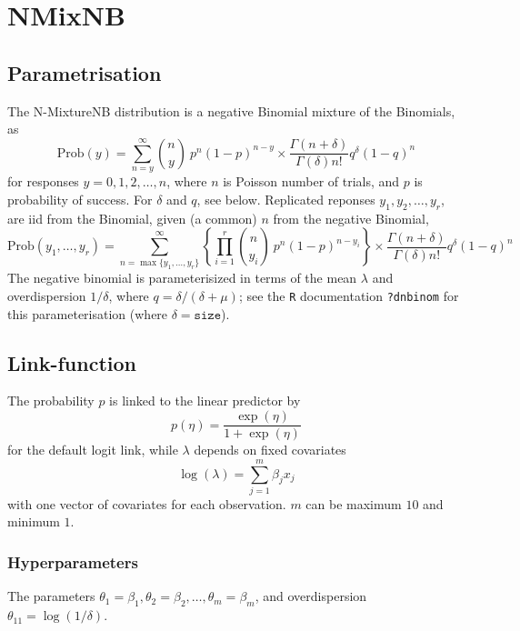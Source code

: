 \documentclass[a4paper,11pt]{article}
\def\mmax{10}
\def\mmaxp1{11}
\begin{document}
\section*{NMixNB}

\subsection*{Parametrisation}

The N-MixtureNB distribution is a negative Binomial mixture of the Binomials, as
\begin{displaymath}
    \text{Prob}(y) = \sum_{n=y}^{\infty} {n \choose y} \ p^n
    (1-p)^{n-y} \times \frac{\Gamma(n + \delta)}{\Gamma(\delta) n!}
    q^{\delta}(1-q)^{n}
\end{displaymath}
for responses $y=0, 1, 2, \ldots,n$, where $n$ is Poisson number of
trials, and $p$ is probability of success. For $\delta$ and $q$, see below.
Replicated reponses
$y_1, y_2, \ldots, y_r$, are iid from the Binomial, given (a common)
$n$ from the negative Binomial,
\begin{displaymath}
    \text{Prob}(y_1, \ldots, y_r) = \sum_{n=\max\{y_1, \ldots,
        y_r\}}^{\infty} \left\{\prod_{i=1}^{r}
    {n \choose y_i} \ p^n
    (1-p)^{n-y_i}\right\} \times \frac{\Gamma(n + \delta)}{\Gamma(\delta) n!}
    q^{\delta}(1-q)^{n}
\end{displaymath}
The negative binomial is parameterisized in terms of the mean
$\lambda$ and overdispersion $1/\delta$, where
$q = \delta/(\delta + \mu)$; see the \texttt{R} documentation
\texttt{?dnbinom} for this parameterisation (where $\delta=\texttt{size}$).

\subsection*{Link-function}

The probability $p$ is linked to the linear predictor by
\begin{displaymath}
    p(\eta) = \frac{\exp(\eta)}{1+\exp(\eta)}
\end{displaymath}
for the default logit link, while $\lambda$ depends on fixed
covariates
\begin{displaymath}
    \log(\lambda) = \sum_{j=1}^{m} \beta_j x_j
\end{displaymath}
with one vector of covariates for each observation. $m$ can be maximum
$\mmax$ and minimum $1$.

\subsubsection*{Hyperparameters}
The parameters
$\theta_1=\beta_1, \theta_2=\beta_2, \ldots, \theta_m=\beta_m$, and
overdispersion $\theta_{\mmaxp1} = \log(1/\delta)$.
\end{document}
